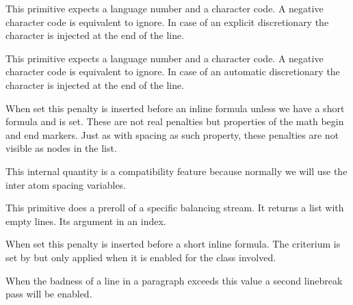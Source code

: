 \startnewprimitive[title={\prm {preexhyphenchar}}]

This primitive expects a language number and a character code. A negative
character code is equivalent to ignore. In case of an explicit discretionary the
character is injected at the end of the line.

\stopnewprimitive

\startnewprimitive[title={\prm {prehyphenchar}}]

This primitive expects a language number and a character code. A negative
character code is equivalent to ignore. In case of an automatic discretionary the
character is injected at the end of the line.

\stopnewprimitive

\startnewprimitive[title={\prm {preinlinepenalty}}]

When set this penalty is inserted before an inline formula unless we have a short
formula and  is set. These are not real penalties but
properties of the math begin and end markers. Just as with spacing as such
property, these penalties are not visible as nodes in the list.

\stopnewprimitive

\startnewprimitive[title={\prm {prerelpenalty}}]

This internal quantity is a compatibility feature because normally we will use
the inter atom spacing variables.

\stopnewprimitive

\startnewprimitive[title={\prm {prerollmvl}}]

This primitive does a preroll of a specific balancing stream. It returns a list
with empty lines. Its argument in an index.

\stopnewprimitive

\startnewprimitive[title={\prm {preshortinlinepenalty}}]

When set this penalty is inserted before a short inline formula. The criterium is
set by  but only applied when it is enabled for
the class involved.

\stopnewprimitive

\startoldprimitive[title={\prm {pretolerance}}]

When the badness of a line in a paragraph exceeds this value a second linebreak
pass will be enabled.

\stopoldprimitive

\startoldprimitive[title={\prm {prevdepth}}]

